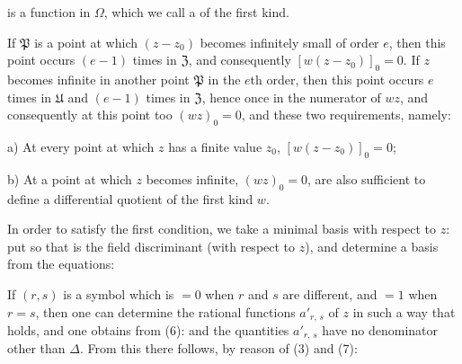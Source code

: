 
is a function in $\Omega$, which we call a 
of the first kind.

If $\mathfrak{P}$ is a point at which $(z - z_0)$ becomes infinitely small of
order $e$, then this point occurs $(e - 1)$ times in $\mathfrak{Z}$,
and consequently $[w(z - z_0)]_0 = 0$. If $z$ becomes infinite in
another point $\mathfrak{P}$ in the $e$th order, then this point occurs
$e$ times in $\mathfrak{U}$ and $(e - 1)$ times in $\mathfrak{Z}$, hence once in the
numerator of $wz$, and consequently at this point too $(wz)_0 = 0$,
and these two requirements, namely:

a) At every point at which $z$ has a finite value $z_0$,
$[w(z - z_0)]_0 = 0$;

b) At a point at which $z$ becomes infinite, $(wz)_0 = 0$,
are also sufficient to define a differential quotient of the first kind
$w$.

In order to satisfy the first condition, we take a
minimal basis with respect to $z$:
put
so that
is the field discriminant (with respect to $z$), and determine a basis
from the equations:

If $(r, s)$ is a symbol which is $= 0$ when $r$ and $s$ are different,
and $= 1$ when $r = s$, then one can determine the rational
functions $a'_{r,\,s}$ of $z$ in such a way that
holds, and one obtains from (6):
and the quantities $a'_{r,\,s}$ have no denominator other than $\Delta$.
From this there follows, by reason of (3) and (7):
